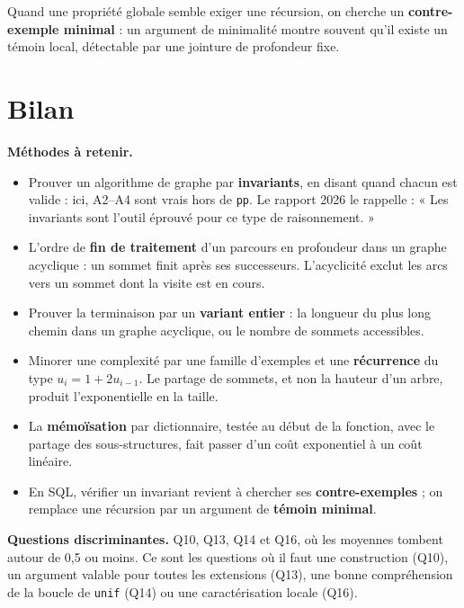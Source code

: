 \documentclass[11pt,a4paper]{article}
\providecommand{\tightlist}{\setlength{\itemsep}{0pt}\setlength{\parskip}{0pt}}
\begin{document}
\begin{methode}

Quand une propriété globale semble exiger une récursion, on cherche un \textbf{contre-exemple minimal} : un argument de minimalité montre souvent qu'il existe un témoin local, détectable par une jointure de profondeur fixe.

\end{methode}

\hypertarget{bilan}{%
\section{Bilan}\label{bilan}}

\textbf{Méthodes à retenir.}

\begin{itemize}
\tightlist
\item
  Prouver un algorithme de graphe par \textbf{invariants}, en disant quand chacun est valide : ici, A2--A4 sont vrais hors de \texttt{pp}. Le rapport 2026 le rappelle : « Les invariants sont l'outil éprouvé pour ce type de raisonnement. »
\item
  L'ordre de \textbf{fin de traitement} d'un parcours en profondeur dans un graphe acyclique : un sommet finit après ses successeurs. L'acyclicité exclut les arcs vers un sommet dont la visite est en cours.
\item
  Prouver la terminaison par un \textbf{variant entier} : la longueur du plus long chemin dans un graphe acyclique, ou le nombre de sommets accessibles.
\item
  Minorer une complexité par une famille d'exemples et une \textbf{récurrence} du type \(u_i=1+2u_{i-1}\). Le partage de sommets, et non la hauteur d'un arbre, produit l'exponentielle en la taille.
\item
  La \textbf{mémoïsation} par dictionnaire, testée au début de la fonction, avec le partage des sous-structures, fait passer d'un coût exponentiel à un coût linéaire.
\item
  En SQL, vérifier un invariant revient à chercher ses \textbf{contre-exemples} ; on remplace une récursion par un argument de \textbf{témoin minimal}.
\end{itemize}

\textbf{Questions discriminantes.} Q10, Q13, Q14 et Q16, où les moyennes tombent autour de 0,5 ou moins. Ce sont les questions où il faut une construction (Q10), un argument valable pour toutes les extensions (Q13), une bonne compréhension de la boucle de \texttt{unif} (Q14) ou une caractérisation locale (Q16).
\end{document}
